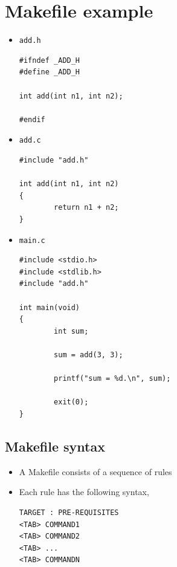 \documentclass{beamer}
\begin{document}
\section{Makefile example}
\label{sec:makefiles}

\begin{frame}[fragile]
  \begin{itemize}
  \item \texttt{add.h}
\begin{lstlisting}
#ifndef _ADD_H
#define _ADD_H

int add(int n1, int n2);

#endif
\end{lstlisting}
  \item \texttt{add.c}
\begin{lstlisting}
#include "add.h"

int add(int n1, int n2)
{
        return n1 + n2;
}
\end{lstlisting}
  \end{itemize}
\end{frame}

\begin{frame}[fragile]
  \begin{itemize}
  \item \texttt{main.c}
\begin{lstlisting}
#include <stdio.h>
#include <stdlib.h>
#include "add.h"

int main(void)
{
        int sum;

        sum = add(3, 3);

        printf("sum = %d.\n", sum);

        exit(0);
}
\end{lstlisting}
  \end{itemize}
\end{frame}

\subsection{Makefile syntax}
\begin{frame}[fragile]
  \begin{itemize}
  \item A Makefile consists of a sequence of rules
  \item Each rule has the following syntax,
\begin{lstlisting}
TARGET : PRE-REQUISITES
<TAB> COMMAND1
<TAB> COMMAND2
<TAB> ...
<TAB> COMMANDN
\end{lstlisting}
  \end{itemize}
\end{frame}
\end{document}
